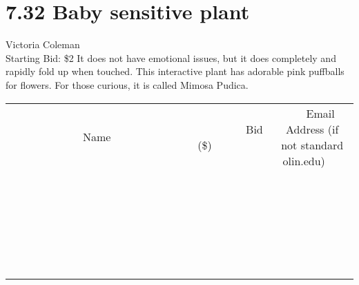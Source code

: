\documentclass[11pt]{article}
\begin{document}
\section*{7.32 Baby sensitive plant}
Victoria Coleman
\\
Starting Bid: \$2
\newline
It does not have emotional issues, but it does completely and rapidly fold up when touched. This interactive plant has adorable pink puffballs for flowers. For those curious, it is called Mimosa Pudica.
\\[6ex]
\begin{tabular}{c c c}
~~~~~~~~~~~~~Name~~~~~~~~~~~~~ & ~~~~~~~~~Bid (\$)~~~~~~~~~  & ~~~Email Address (if not standard olin.edu)~~~\\
 & & \\
\hline
 & & \\
\hline
 & & \\
\hline
 & & \\
\hline
 & & \\
\hline
 & & \\
\hline
 & & \\
\hline
 & & \\
\hline
 & & \\
\hline
 & & \\
\hline
 & & \\
\hline
 & & \\
\hline
 & & \\
\hline
 & & \\
\hline
 & & \\
\hline
 & & \\
\hline
 & & \\
\hline
 & & \\
\hline
 & & \\
\hline
 & & \\
\hline
 & & \\
\hline
 & & \\
\hline
 & & \\
\hline
 & & \\
\hline
 & & \\
\hline
 & & \\
\hline
\end{tabular}
\newpage
\end{document}
